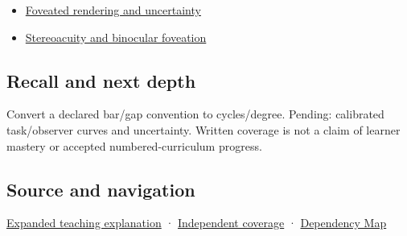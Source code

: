 \hypertarget{appendix-b491fc48c54b-used-by}{}

\begin{itemize}
\tightlist
\item
  \hyperref[appendix-5878b813b732]{Foveated rendering and uncertainty}
\item
  \hyperref[appendix-8dc848f14052]{Stereoacuity and binocular foveation}
\end{itemize}

\subsection{Recall and next depth}\label{appendix-b491fc48c54b-recall-and-next-depth}

\hypertarget{appendix-b491fc48c54b-recall-and-next-depth}{}

Convert a declared bar/gap convention to cycles/degree. Pending: calibrated task/observer curves and uncertainty. Written coverage is not a claim of learner mastery or accepted numbered-curriculum progress.

\subsection{Source and navigation}\label{appendix-b491fc48c54b-source-and-navigation}

\hypertarget{appendix-b491fc48c54b-source-and-navigation}{}

\hyperref[04-visual-computing-ii-ch042-visibility-is-about-contrast-conditions-and-tasks]{Expanded teaching explanation} · \hyperref[appendix-fd090d982a15-xr01---independent-seeing-and-representation-source]{Independent coverage} · \hyperref[appendix-4ad47bdd269a]{Dependency Map}
